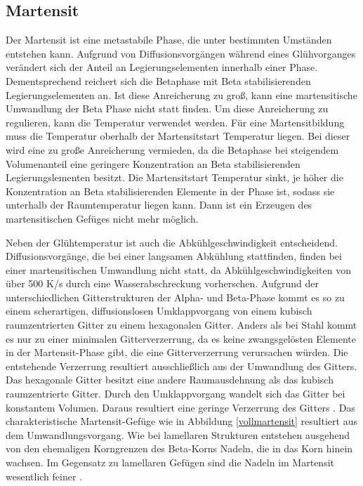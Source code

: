 \documentclass[a4paper, 11pt]{tubsreprt}
\begin{document}
\subsection{Martensit}
Der Martensit ist eine metastabile Phase, die unter bestimmten Umständen entstehen kann. Aufgrund von Diffusionsvorgängen während eines Glühvorganges verändert sich der Anteil an Legierungselementen innerhalb einer Phase. Dementsprechend reichert sich die Betaphase mit Beta stabilisierenden Legierungselementen an. Ist diese Anreicherung zu groß, kann eine martensitische Umwandlung der Beta Phase nicht statt finden. Um diese Anreicherung zu regulieren, kann die Temperatur verwendet werden. Für eine Martensitbildung muss die Temperatur oberhalb der Martensitstart Temperatur liegen. Bei dieser wird eine zu große Anreicherung vermieden, da die Betaphase bei steigendem Volumenanteil eine geringere Konzentration an Beta stabilisierenden Legierungslementen besitzt. Die Martensitstart Temperatur sinkt, je höher die Konzentration an Beta stabilisierenden Elemente in der Phase ist, sodass sie unterhalb der Raumtemperatur liegen kann. Dann ist ein Erzeugen des martensitischen Gefüges nicht mehr möglich.

Neben der Glühtemperatur ist auch die Abkühlgeschwindigkeit entscheidend. Diffusionsvorgänge, die bei einer langsamen Abkühlung stattfinden, finden bei einer martensitischen Umwandlung nicht statt, da Abkühlgeschwindigkeiten von über 500 K/s durch eine Wasserabschreckung vorherschen. Aufgrund der unterschiedlichen Gitterstrukturen der Alpha- und Beta-Phase kommt es so zu einem scherartigen, diffusionslosen Umklappvorgang von einem kubisch raumzentrierten Gitter zu einem hexagonalen Gitter. Anders als bei Stahl kommt es nur zu einer minimalen Gitterverzerrung, da es keine zwangsgelösten Elemente in der Martensit-Phase gibt, die eine Gitterverzerrung verursachen würden. Die entstehende Verzerrung resultiert ausschließlich aus der Umwandlung des Gitters. Das hexagonale Gitter besitzt eine andere Raumausdehnung als das kubisch raumzentrierte Gitter. Durch den Umklappvorgang wandelt sich das Gitter bei konstantem Volumen. Daraus resultiert eine geringe Verzerrung des Gitters \cite{Luetjering2007}. Das charakteristische Martensit-Gefüge wie in Abbildung \ref{vollmartensit} resultiert aus dem Umwandlungsvorgang. Wie bei lamellaren Strukturen entstehen ausgehend von den ehemaligen Korngrenzen des Beta-Korns Nadeln, die in das Korn hinein wachsen. Im Gegensatz zu lamellaren Gefügen sind die Nadeln im Martensit wesentlich feiner \cite{Luetjering2007}.
\end{document}
